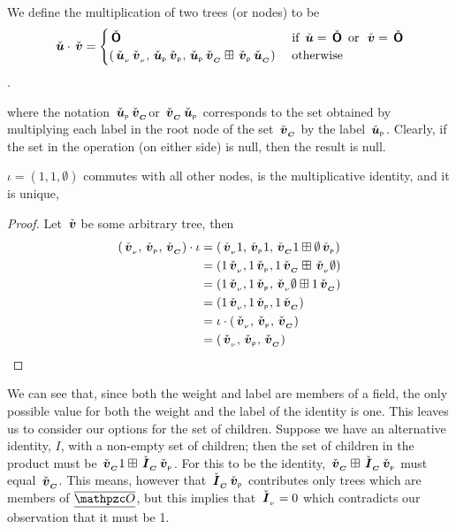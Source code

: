 \begin{definition}\label{rtreemult}
  We define the multiplication of two trees (or nodes) to be
  \[
  \rnode{u} \tdot \rnode{v} = \begin{cases}
     \rzerotree & \text{ if } \rnode{u} = \rzerotree \mor \rnode{v} = \rzerotree \\
     (\rv{u} \rv{v}, \rlabel{u} \rlabel{v}, \rlabel{u} \rchild{v} \stplus \rlabel{v} \rchild{u}) & \text{  otherwise}
  \end{cases}
  \].
  
\end{definition}    

where the notation $\rlabel{u} \rchild{v}$or $\rchild{v} \rlabel{u}$ corresponds to the set
obtained by multiplying each label in the root node of the set
$\rchild{v}$ by the label $\rlabel{u}$. Clearly, if the set in the
operation (on either side) is null, then the result is null.

\begin{proposition}
  $\iota = (1, 1, \emptyset)$ commutes with all other nodes, is the
  multiplicative identity, and it is unique, 
  \begin{proof}
    Let $\rnode{v}$ be some arbitrary tree, then
    \begin{align*}
      (\rv{v},\rlabel{v},\rchild{v})\tdot \iota &= (\rv{v}  1, \rlabel{v} 1, \rchild{v} 1 \stplus \emptyset \rlabel{v}) \\
      &= (1 \rv{v}, 1 \rlabel{v}, 1 \rchild{v} \stplus \rv{v} \emptyset) \\
      &= (1 \rv{v}, 1 \rlabel{v}, \rv{v} \emptyset \stplus 1 \rchild{v}) \\
      &= (1 \rv{v}, 1 \rlabel{v}, 1 \rchild{v}) \\
      &= \iota\tdot(\rv{v}, \rlabel{v}, \rchild{v}) \\
      &= (\rv{v}, \rlabel{v}, \rchild{v}) \\
    \end{align*}
  \end{proof}

  We can see that, since both the weight and label are members of a
  field, the only possible value for both the weight
  and the label of the identity is one.  This leaves us to consider our
  options for the set of children. Suppose we have an alternative
  identity, $I$, with a non-empty set of children; then the set of children in
  the product must be $\rchild{v} 1 \stplus \rchild{I} \rlabel{v}$. For
  this to be the identity, $\rchild{v} \stplus \rchild{I} \rlabel{v}$ must
  equal $\rchild{v}$. This means, however that $\rchild{I}
  \rlabel{v}$ contributes only trees which are members of $\nullspace$,
  but this implies that $\rv{I} = 0$ which contradicts our observation
  that it must be 1.
\end{proposition}

